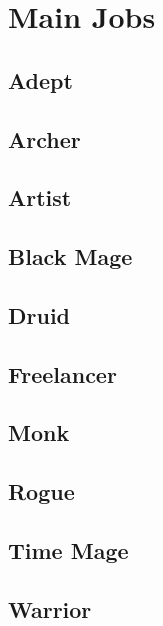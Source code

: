 \section{Main Jobs}
\label{sec:pjob}

\subsection{Adept}


\subsection{Archer}


\subsection{Artist}


\subsection{Black Mage}


\subsection{Druid}


\subsection{Freelancer}


\subsection{Monk}


\subsection{Rogue}


\subsection{Time Mage}


\subsection{Warrior}


